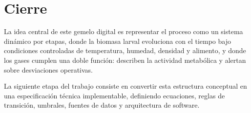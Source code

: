 \documentclass[12pt,a4paper]{report}
\begin{document}
\chapter{Cierre}

La idea central de este gemelo digital es representar el proceso como un sistema dinámico por etapas, donde la biomasa larval evoluciona con el tiempo bajo condiciones controladas de temperatura, humedad, densidad y alimento, y donde los gases cumplen una doble función: describen la actividad metabólica y alertan sobre desviaciones operativas.

La siguiente etapa del trabajo consiste en convertir esta estructura conceptual en una especificación técnica implementable, definiendo ecuaciones, reglas de transición, umbrales, fuentes de datos y arquitectura de software.
\end{document}
